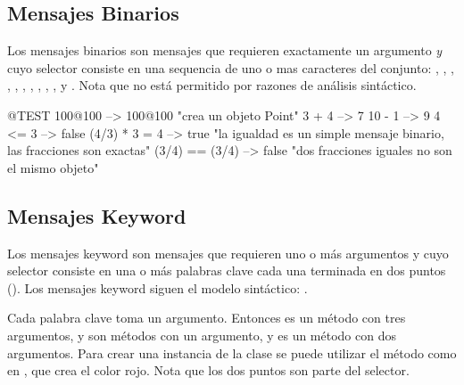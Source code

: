 \documentclass[a4paper,10pt,twoside]{book}
\begin{document}
\subsection{Mensajes Binarios}
Los mensajes binarios son mensajes que requieren exactamente un argumento \emph{y} cuyo selector consiste en una sequencia de uno o mas caracteres del conjunto: \ct{+}, \ct{-}, \ct{*}, \ct{/}, \ct{&}, \ct{=}, \ct{>}, \ct{|}, \ct{<}, \ct{~}, y . Nota que \ct{--} no est\'a permitido por razones de an\'alisis sint\'actico.

\begin{code}{@TEST}
100@100      --> 100@100  "crea un objeto Point"
3 + 4              --> 7
10 - 1            --> 9
4 <= 3            --> false
(4/3) * 3 = 4   --> true  "la igualdad es un simple mensaje binario, las fracciones son exactas"
(3/4) == (3/4) --> false  "dos fracciones iguales no son el mismo objeto"
\end{code}


\subsection{Mensajes Keyword}

Los mensajes keyword son mensajes que requieren uno o m\'as argumentos y cuyo selector consiste en una o m\'as palabras clave cada una terminada en dos puntos (\ct{:}). Los mensajes keyword siguen el modelo sint\'actico:  .

Cada palabra clave toma un argumento. Entonces  es un m\'etodo con tres argumentos,  y  son m\'etodos con un argumento, y  es un m\'etodo con dos argumentos. Para crear una instancia de la clase  se puede utilizar el m\'etodo  como en , que crea el color rojo. Nota que los dos puntos son parte del selector.

\end{document}
